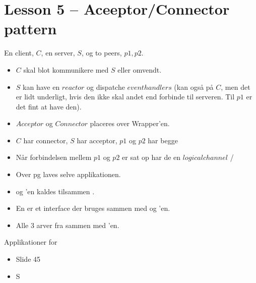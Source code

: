 \documentclass[10pt, a4]{Memoir}
\begin{document}
\newpage
\section*{Lesson 5 -- Aceeptor/Connector pattern}

En client, $C$, en server, $S$, og to peers, $p1, p2$.
\begin{itemize}
	\item $C$ skal blot kommunikere med $S$ eller omvendt.
	\item $S$ kan have en $reactor$ og dispatche $event handlers$ (kan også på $C$, men det er lidt underligt, hvis den ikke skal andet end forbinde til serveren. Til $p1$ er det fint at have den).
	\item $Acceptor$ og $Connector$ placeres over Wrapper'en.
	\item $C$ har connector, $S$ har acceptor, $p1$ og $p2$ har begge
	\item Når forbindelsen mellem $p1$ og $p2$ er sat op har de en $logical channel$ /  
	\item Over  pg  laves selve applikationen.
	\item {} og 'en kaldes tilsammen .
	\item En  er et interface der bruges sammen med  og 'en.
	\item Alle 3 arver fra  sammen med 'en.
\end{itemize}
Applikationer for 
\begin{itemize}
	\item Slide 45
	\item S
\end{itemize}
\end{document}
